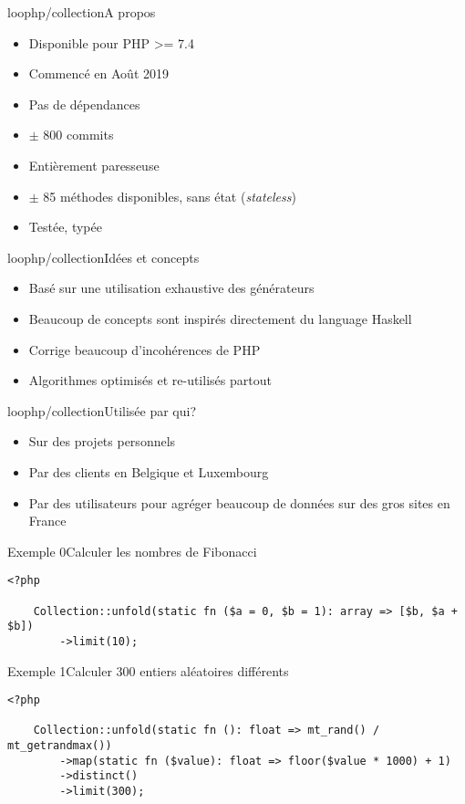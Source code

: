 \begin{frame}{loophp/collection}{A propos}
    \begin{itemize}[<+->]
        \item Disponible pour PHP >= 7.4
        \item Commencé en Août 2019
        \item Pas de dépendances
        \item $\pm$ 800 commits
        \item Entièrement paresseuse
        \item $\pm$ 85 méthodes disponibles, sans état (\textit{stateless})
        \item Testée, typée
    \end{itemize}
\end{frame}

\begin{frame}{loophp/collection}{Idées et concepts}
    \begin{itemize}[<+->]
        \item Basé sur une utilisation exhaustive des générateurs
        \item Beaucoup de concepts sont inspirés directement du language Haskell
        \item Corrige beaucoup d'incohérences de PHP
        \item Algorithmes optimisés et re-utilisés partout
    \end{itemize}
\end{frame}

\begin{frame}{loophp/collection}{Utilisée par qui?}
    \begin{itemize}[<+->]
        \item Sur des projets personnels
        \item Par des clients en Belgique et Luxembourg
        \item Par des utilisateurs pour agréger beaucoup de données sur des gros
        sites en France
    \end{itemize}
\end{frame}

\begin{frame}[fragile]{Exemple 0}{Calculer les nombres de Fibonacci}
    \begin{lstlisting}[firstnumber=1]
    <?php

    Collection::unfold(static fn ($a = 0, $b = 1): array => [$b, $a + $b])
        ->limit(10);
    \end{lstlisting}
\end{frame}

\begin{frame}[fragile]{Exemple 1}{Calculer 300 entiers aléatoires différents}
    \begin{lstlisting}[firstnumber=1]
    <?php

    Collection::unfold(static fn (): float => mt_rand() / mt_getrandmax())
        ->map(static fn ($value): float => floor($value * 1000) + 1)
        ->distinct()
        ->limit(300);
    \end{lstlisting}
\end{frame}
